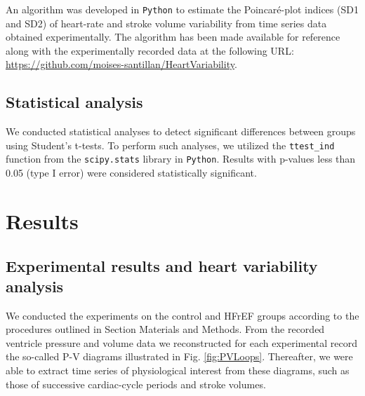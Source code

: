 \documentclass[%
preprint,
 amsmath,amssymb,
 aps,
]{revtex4-2}
\begin{document}
An algorithm was developed in \texttt{Python} to estimate the Poincaré-plot indices (SD1 and SD2) of heart-rate and stroke volume variability from time series data obtained experimentally. The algorithm has been made available for reference along with the experimentally recorded data at the following URL: \url{https://github.com/moises-santillan/HeartVariability}.

\subsection{Statistical analysis}

We conducted statistical analyses to detect significant differences between groups using Student's t-tests. To perform such analyses, we utilized the \texttt{ttest\_ind} function from the \texttt{scipy.stats} library in \texttt{Python}. Results with p-values less than 0.05 (type I error) were considered statistically significant.

\section{\label{sec:res}Results}

\subsection{\label{sec:conclu}Experimental results and heart variability analysis}

We conducted the experiments on the control and HFrEF groups according to the procedures outlined in Section Materials and Methods. From the recorded ventricle pressure and volume data we reconstructed for each experimental record the so-called P-V diagrams illustrated in Fig. \ref{fig:PVLoops}. Thereafter, we were able to extract time series of physiological interest from these diagrams, such as those of successive cardiac-cycle periods and stroke volumes.
\end{document}
